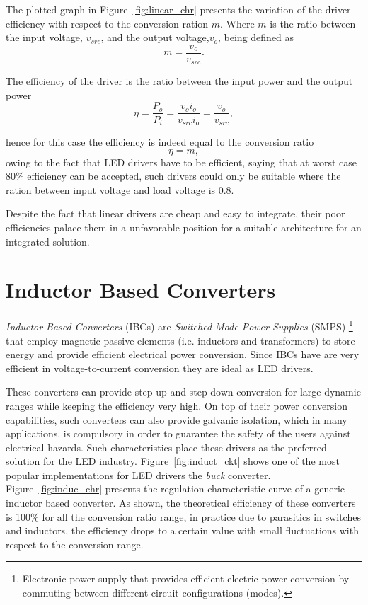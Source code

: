The plotted graph in Figure~\ref{fig:linear_chr} presents the variation of the driver efficiency with respect to the conversion ration $m$. Where $m$  is the ratio between the input voltage, $v_{src}$,  and the output voltage,$v_o$, being defined as
   \begin{equation}
        m = \frac{v_o}{v_{src}}.
   \end{equation}

The efficiency of the driver is the ratio between the input power and the output power
   \begin{equation}
        \eta = \frac{P_o}{P_i} = \frac{v_o i_o}{v_{src} i_o} = \frac{v_o}{v_{src}},
   \end{equation}

hence for this case the efficiency is indeed equal to the conversion ratio
   \begin{equation}
        \eta = m,
   \end{equation}
owing to the fact that LED drivers have to be efficient, saying that at worst case 80\% efficiency can be accepted, such drivers could only be suitable where the ration between input voltage and load voltage is 0.8.

Despite the fact that linear drivers are cheap and easy to integrate, their poor efficiencies  palace them in a unfavorable position for a suitable architecture for an integrated solution.

\section{Inductor Based Converters}

\emph{Inductor Based Converters} (IBCs) are \emph{Switched Mode Power Supplies} (SMPS) \footnote{Electronic power supply that provides efficient electric power conversion by commuting between different circuit configurations (modes).}  that employ magnetic passive elements (i.e. inductors and transformers) to store energy and provide efficient electrical power conversion. Since IBCs have are very efficient in voltage-to-current conversion they are ideal as LED drivers.

These converters can provide step-up and step-down conversion for large dynamic ranges while keeping the efficiency very high. On top of their power conversion capabilities, such converters can also provide galvanic isolation, which in many applications, is compulsory in order to guarantee the safety of the users against electrical hazards. Such characteristics place these drivers as the preferred solution for the LED industry. Figure~\ref{fig:induct_ckt} shows one of the most popular implementations for LED drivers the \emph{buck} converter.  Figure~\ref{fig:induc_chr} presents the regulation characteristic curve of a generic  inductor based converter. As shown, the theoretical efficiency of these converters is 100\% for all the conversion ratio range, in practice due to parasitics in switches and inductors, the efficiency drops to a certain value with small fluctuations with respect to the conversion range.

